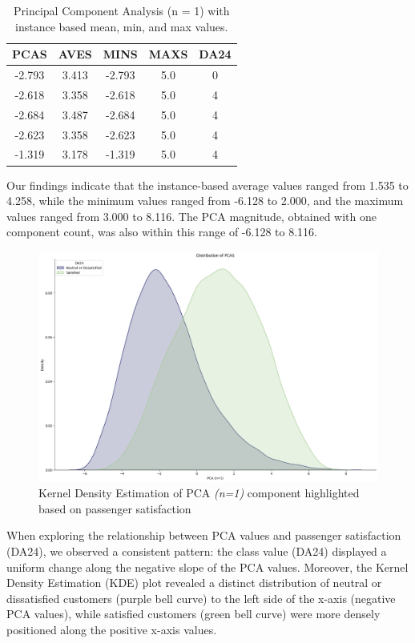 \documentclass[11pt]{article}
\begin{document}
\begin{table}[!h]
    \centering
    \begin{tabular}{|c|c|c|c|c|}
        \hline
        PCAS &  AVES &  MINS & MAXS & DA24 \\
        \hline
        -2.793 & 3.413 & -2.793  & 5.0  &   0 \\
        \hline
        -2.618 & 3.358 & -2.618  & 5.0  &   4 \\
        \hline
        -2.684 & 3.487 & -2.684  & 5.0  &   4 \\
        \hline
        -2.623 & 3.358 & -2.623  & 5.0  &   4 \\
        \hline
        -1.319 & 3.178 & -1.319  & 5.0  &   4 \\
        \hline
    \end{tabular}
    \caption{Principal Component Analysis (n = 1) with instance based mean, min, and max values.}
    \label{tab:pca}
\end{table}

Our findings indicate that the instance-based average values ranged from 1.535 to 4.258, while the minimum values ranged from -6.128 to 2.000, and the maximum values ranged from 3.000 to 8.116. The PCA magnitude, obtained with one component count, was also within this range of -6.128 to 8.116.

\begin{figure}[h]
\centering
\includegraphics[width=0.7\linewidth]{project_files/project_37_0.png}
\caption{\centering Kernel Density Estimation of PCA \emph{(n=1)} component highlighted based on passenger satisfaction}
\end{figure}

When exploring the relationship between PCA values and passenger satisfaction (DA24), we observed a consistent pattern: the class value (DA24) displayed a uniform change along the negative slope of the PCA values. Moreover, the Kernel Density Estimation (KDE) plot revealed a distinct distribution of neutral or dissatisfied customers (purple bell curve) to the left side of the x-axis (negative PCA values), while satisfied customers (green bell curve) were more densely positioned along the positive x-axis values.
\end{document}
